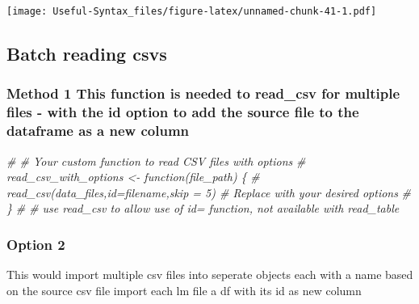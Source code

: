 \documentclass[
]{article}
\newenvironment{Shaded}{\begin{snugshade}}{\end{snugshade}}
\newcommand{\CommentTok}[1]{\textcolor[rgb]{0.56,0.35,0.01}{\textit{#1}}}
\begin{document}
\texttt{[image: Useful-Syntax\_files/figure-latex/unnamed-chunk-41-1.pdf]}

\hypertarget{batch-reading-csvs}{%
\subsection{Batch reading csvs}\label{batch-reading-csvs}}

\hypertarget{method-1-this-function-is-needed-to-read_csv-for-multiple-files---with-the-id-option-to-add-the-source-file-to-the-dataframe-as-a-new-column}{%
\subsubsection{Method 1 This function is needed to read\_csv for multiple files - with the id option to add the source file to the dataframe as a new column}\label{method-1-this-function-is-needed-to-read_csv-for-multiple-files---with-the-id-option-to-add-the-source-file-to-the-dataframe-as-a-new-column}}

\begin{Shaded}
\begin{Highlighting}[]
\CommentTok{\# \# Your custom function to read CSV files with options}
\CommentTok{\# read\_csv\_with\_options \textless{}{-} function(file\_path) \{}
\CommentTok{\#   read\_csv(data\_files,id=\textquotesingle{}filename\textquotesingle{},skip = 5)  \# Replace with your desired options}
\CommentTok{\# \}}
\CommentTok{\# \# use read\_csv to allow use of id= function, not available with read\_table}
\end{Highlighting}
\end{Shaded}

\hypertarget{option-2}{%
\subsubsection{Option 2}\label{option-2}}

This would import multiple csv files into seperate objects each with a name based on the source csv file
import each lm file a df with its id as new column
\end{document}
